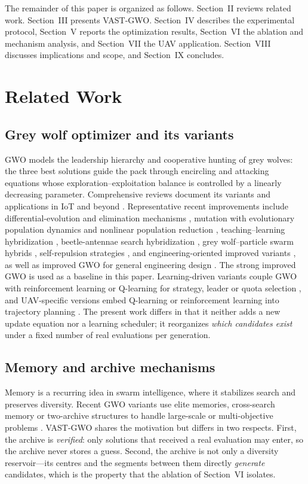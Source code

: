 \documentclass[journal]{IEEEtran}
\newcommand{\method}{VAST-GWO}
\begin{document}
The remainder of this paper is organized as follows. Section~II reviews
related work. Section~III presents \method{}. Section~IV describes the
experimental protocol, Section~V reports the optimization results,
Section~VI the ablation and mechanism analysis, and Section~VII the UAV
application. Section~VIII discusses implications and scope, and Section~IX
concludes.

\section{Related Work}
\subsection{Grey wolf optimizer and its variants}
GWO \cite{mirjalili2014gwo} models the leadership hierarchy and cooperative
hunting of grey wolves: the three best solutions guide the pack through
encircling and attacking equations whose exploration--exploitation balance is
controlled by a linearly decreasing parameter. Comprehensive reviews document
its variants and applications in IoT and beyond
\cite{nadimishahraki2024iot,makhadmeh2023review}. Representative recent
improvements include differential-evolution and elimination mechanisms
\cite{wang2019igwode}, mutation with evolutionary population dynamics and
nonlinear population reduction \cite{zhang2025mutation}, teaching--learning
hybridization \cite{singh2025tlbo}, beetle-antennae search hybridization
\cite{zhang2025bagwo}, grey wolf--particle swarm hybrids
\cite{shaikh2025hybrid}, self-repulsion strategies \cite{wang2025selfrepulsion},
and engineering-oriented improved variants \cite{li2021sustainability}, as
well as improved GWO for general engineering design
\cite{nadimi2021igwo}. The strong improved GWO \cite{nadimi2021igwo} is used
as a baseline in this paper. Learning-driven variants couple GWO with
reinforcement learning or Q-learning for strategy, leader or quota selection
\cite{yin2026amsgwo,huang2026qlfdgwo,khalid2026aogwo,wang2026dmsgwo}, and
UAV-specific versions embed Q-learning or reinforcement learning into
trajectory planning \cite{nayeem2025drones,jia2025drones}. The present work
differs in that it neither adds a new update equation nor a learning
scheduler; it reorganizes \emph{which candidates exist} under a fixed number
of real evaluations per generation.

\subsection{Memory and archive mechanisms}
Memory is a recurring idea in swarm intelligence, where it stabilizes search
and preserves diversity. Recent GWO variants use elite memories, cross-search
memory or two-archive structures to handle large-scale or multi-objective
problems \cite{zamani2026egwo,tejani2025twoarchive}. \method{} shares the
motivation but differs in two respects. First, the archive is
\emph{verified}: only solutions that received a real evaluation may enter, so
the archive never stores a guess. Second, the archive is not only a
diversity reservoir---its centres and the segments between them directly
\emph{generate} candidates, which is the property that the ablation of
Section~VI isolates.
\end{document}
